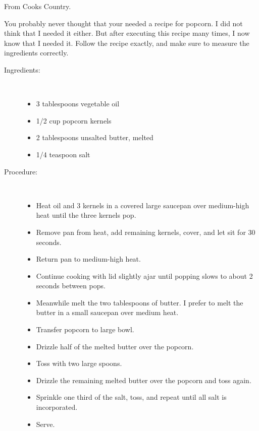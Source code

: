 \documentclass[11pt,letterpaper]{article}
\begin{document}


\begin{flushright}
{\hspace{4in} From Cooks Country.}
\end{flushright}
\vspace{0.5in}

You probably never thought that your needed a recipe for popcorn. I did not think that I needed it either. But after executing this recipe many times, I now know that I needed it. Follow the recipe exactly, and make sure to measure the ingredients correctly.


\begin{description}

\item[Ingredients:]\ \\
	\begin{itemize}
	\item	 3 tablespoons vegetable oil
	\item 1/2 cup popcorn kernels
	\item 2 tablespoons unsalted butter, melted
	\item 1/4  teaspoon salt
	\end{itemize}

\item[Procedure:]\ \\

	\begin{itemize}
	\item Heat oil and 3 kernels in a covered large saucepan over medium-high heat until the three kernels pop. 
	\item Remove pan from heat, add remaining kernels, cover, and let sit for 30 seconds.
	\item Return pan to medium-high heat. 
	\item Continue cooking with lid slightly ajar until popping slows to about 2 seconds between pops. 
	\item Meanwhile melt the two tablespoons of butter. I prefer to melt the butter in a small saucepan over medium heat. 
	\item Transfer popcorn to large bowl. 
	\item Drizzle half of the melted butter over the popcorn.
	\item Toss with two large spoons.
	\item  Drizzle the remaining melted butter over the popcorn and toss again.
	\item Sprinkle one third of the salt, toss, and repeat until all salt is incorporated.
	\item Serve.
	\end{itemize}
\end{description}
\end{document}

